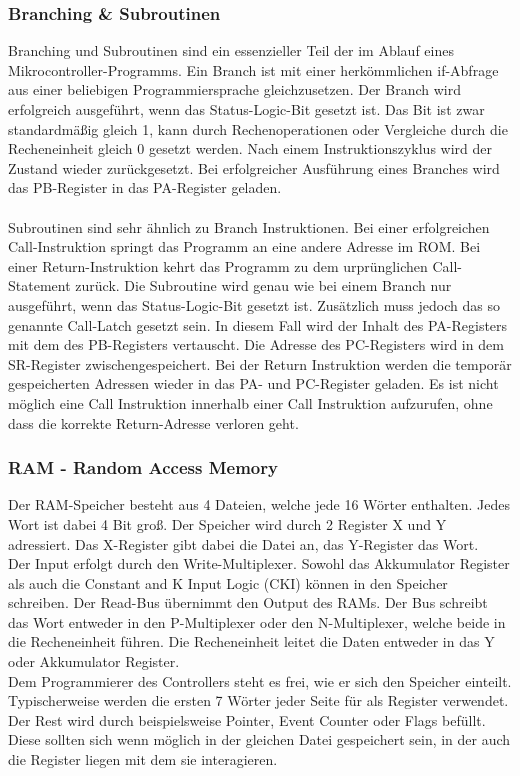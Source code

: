 \subsubsection{Branching \& Subroutinen}

Branching und Subroutinen sind ein essenzieller Teil der im Ablauf eines Mikrocontroller-Programms. Ein Branch ist mit einer herk{\"o}mmlichen if-Abfrage aus einer beliebigen Programmiersprache gleichzusetzen. Der Branch wird erfolgreich ausgef{\"u}hrt, wenn das Status-Logic-Bit gesetzt ist. Das Bit ist zwar standardm{\"a}{\ss}ig gleich 1, kann durch Rechenoperationen oder Vergleiche durch die Recheneinheit gleich 0 gesetzt werden. Nach einem Instruktionszyklus wird der Zustand wieder zur{\"u}ckgesetzt. Bei erfolgreicher Ausf{\"u}hrung eines Branches wird das PB-Register in das PA-Register geladen. \\
\\
Subroutinen sind sehr {\"a}hnlich zu Branch Instruktionen. Bei einer erfolgreichen Call-Instruktion springt das Programm an eine andere Adresse im ROM. Bei einer Return-Instruktion kehrt das Programm zu dem urpr{\"u}nglichen Call-Statement zur{\"u}ck. Die Subroutine wird genau wie bei einem Branch nur ausgef{\"u}hrt, wenn das Status-Logic-Bit gesetzt ist. Zus{\"a}tzlich muss jedoch das so genannte Call-Latch gesetzt sein. In diesem Fall wird der Inhalt des PA-Registers mit dem des PB-Registers vertauscht. Die Adresse des PC-Registers wird in dem SR-Register zwischengespeichert. Bei der Return Instruktion werden die tempor{\"a}r gespeicherten Adressen wieder in das PA- und PC-Register geladen. Es ist nicht m{\"o}glich eine Call Instruktion innerhalb einer Call Instruktion aufzurufen, ohne dass die korrekte Return-Adresse verloren geht.

\subsubsection{RAM - Random Access Memory}

Der RAM-Speicher besteht aus 4 Dateien, welche jede 16 W{\"o}rter enthalten. Jedes Wort ist dabei 4 Bit gro{\ss}. Der Speicher wird durch 2 Register X und Y adressiert. Das X-Register gibt dabei die Datei an, das Y-Register das Wort.\\
Der Input erfolgt durch den Write-Multiplexer. Sowohl das Akkumulator Register als auch die Constant and K Input Logic (CKI) k{\"o}nnen in den Speicher schreiben. Der Read-Bus {\"u}bernimmt den Output des RAMs. Der Bus schreibt das Wort entweder in den P-Multiplexer oder den N-Multiplexer, welche beide in die Recheneinheit f{\"u}hren. Die Recheneinheit leitet die Daten entweder in das Y oder Akkumulator Register. \\
Dem Programmierer des Controllers steht es frei, wie er sich den Speicher einteilt. Typischerweise werden die ersten 7 W{\"o}rter jeder Seite f{\"u}r als Register verwendet. Der Rest wird durch beispielsweise Pointer, Event Counter oder Flags bef{\"u}llt. Diese sollten sich wenn m{\"o}glich in der gleichen Datei gespeichert sein, in der auch die Register liegen mit dem sie interagieren.

